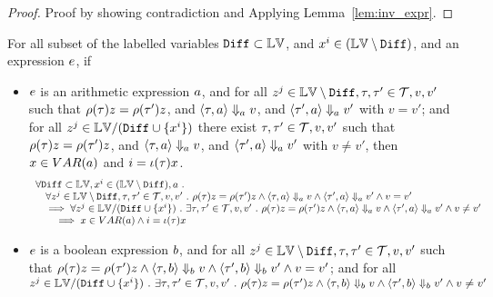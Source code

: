 	\begin{proof}
		Proof by showing contradiction and Applying Lemma~\ref{lem:inv_expr}.
	\end{proof}
\begin{lem}
	\label{lem:inv_expr_gnl_II}
	For all subset of the labelled variables $\mathtt{Diff} \subset \mathbb{LV}$, and $x^i \in (\mathbb{LV} \setminus \mathtt{Diff})$,
	and an expression $e$, if 
	\begin{itemize}
		\item $e$ is an arithmetic expression $a$,
		and for all $z^j \in \mathbb{LV} \setminus \mathtt{Diff}, \mathtt{\tau}, \mathtt{\tau}' \in \mathcal{T}, v, v'$ such that 
		$\rho(\mathtt{\tau}) z = \rho(\mathtt{\tau}') z$, and 
		$
		\langle \mathtt{\tau}, a \rangle \Downarrow_a v$, and $\langle \mathtt{\tau}', a \rangle \Downarrow_a v'$ with $v = v'$;
		and for all $z^j \in \mathbb{LV} / (\mathtt{Diff} \cup \{x^i\} )$ 
		there exist $\mathtt{\tau}, \mathtt{\tau}' \in \mathcal{T}, v, v'$ such that 
		$\rho(\mathtt{\tau}) z = \rho(\mathtt{\tau}') z$, and 
		$
		\langle \mathtt{\tau}, a \rangle \Downarrow_a v$, and $\langle \mathtt{\tau}', a \rangle \Downarrow_a v'$ with $v \neq v'$,
		then $x \in VAR(a)$ and $i = \iota(\mathtt{\tau}) x$.
		\[
			\begin{array}{l}
			\forall \mathtt{Diff} \subset \mathbb{LV},  x^i \in (\mathbb{LV} \setminus \mathtt{Diff}), a ~.~ 
			\\ \quad
			\forall z^j \in \mathbb{LV} \setminus \mathtt{Diff}, \mathtt{\tau}, \mathtt{\tau}' \in \mathcal{T}, v, v' ~.~  
			\rho(\mathtt{\tau}) z = \rho(\mathtt{\tau}') z \land 
			\langle \mathtt{\tau}, a \rangle \Downarrow_a v \land \langle \mathtt{\tau}', a \rangle \Downarrow_a v' \land v = v'
			\\ \quad
			\implies 
			\forall z^j \in \mathbb{LV} / (\mathtt{Diff} \cup \{x^i\} ) ~.~  
			\exists \mathtt{\tau}, \mathtt{\tau}' \in \mathcal{T}, v, v' ~.~  
			\rho(\mathtt{\tau}) z = \rho(\mathtt{\tau}') z \land 
			\langle \mathtt{\tau}, a \rangle \Downarrow_a v \land \langle \mathtt{\tau}', a \rangle \Downarrow_a v' \land v \neq v'
			\\ \qquad
			\implies x \in VAR(a) \land i = \iota(\mathtt{\tau}) x
			\end{array}
		\]
	\item $e$ is a boolean expression $b$,
	and for all $ z^j \in \mathbb{LV} \setminus \mathtt{Diff}, \mathtt{\tau}, \mathtt{\tau}' \in \mathcal{T}, v, v'$ such that 
	$ \rho(\mathtt{\tau}) z = \rho(\mathtt{\tau}') z \land 
	\langle \mathtt{\tau}, b \rangle \Downarrow_b v \land \langle \mathtt{\tau}', b \rangle \Downarrow_b v' \land v = v'$;
	and for all
	$ z^j \in \mathbb{LV} / (\mathtt{Diff} \cup \{x^i\} ) ~.~  
	 \exists \mathtt{\tau}, \mathtt{\tau}' \in \mathcal{T}, v, v' ~.~  
	\rho(\mathtt{\tau}) z = \rho(\mathtt{\tau}') z \land 
	\langle \mathtt{\tau}, b \rangle \Downarrow_b v \land \langle \mathtt{\tau}', b \rangle \Downarrow_b v' \land v \neq v'$

\end{itemize}
\end{lem}
